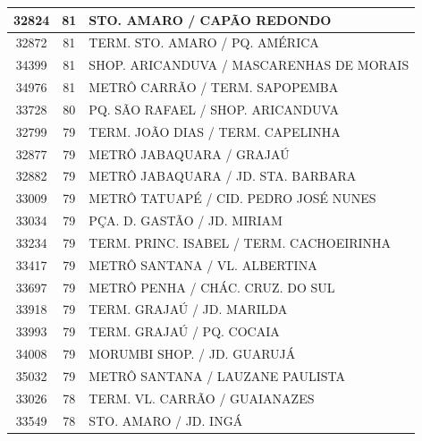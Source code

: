 \documentclass[
	12pt,				%
	oneside,			%
	a4paper,			%
	english,			%
	brazil				%
	]{abntex2ppgsi}
\begin{document}
{{\begin{apendicesenv}
\begin{longtable}{c|c|p{7cm}}
    32824 & 81    & STO. AMARO / CAPÃO REDONDO \\
\hline

    32872 & 81    & TERM. STO. AMARO / PQ. AMÉRICA \\
\hline

    34399 & 81    & SHOP. ARICANDUVA / MASCARENHAS DE MORAIS \\
\hline

    34976 & 81    & METRÔ CARRÃO / TERM. SAPOPEMBA \\
\hline

    33728 & 80    & PQ. SÃO RAFAEL / SHOP. ARICANDUVA \\
\hline

    32799 & 79    & TERM. JOÃO DIAS / TERM. CAPELINHA \\
\hline

    32877 & 79    & METRÔ JABAQUARA / GRAJAÚ \\
\hline

    32882 & 79    & METRÔ JABAQUARA / JD. STA. BARBARA \\
\hline

    33009 & 79    & METRÔ TATUAPÉ / CID. PEDRO JOSÉ NUNES \\
\hline

    33034 & 79    & PÇA. D. GASTÃO / JD. MIRIAM \\
\hline

    33234 & 79    & TERM. PRINC. ISABEL / TERM. CACHOEIRINHA \\
\hline

    33417 & 79    & METRÔ SANTANA / VL. ALBERTINA \\
\hline

    33697 & 79    & METRÔ PENHA / CHÁC. CRUZ. DO SUL \\
\hline

    33918 & 79    & TERM. GRAJAÚ / JD. MARILDA \\
\hline

    33993 & 79    & TERM. GRAJAÚ / PQ. COCAIA \\
\hline

    34008 & 79    & MORUMBI SHOP. / JD. GUARUJÁ \\
\hline

    35032 & 79    & METRÔ SANTANA / LAUZANE PAULISTA \\
\hline

    33026 & 78    & TERM. VL. CARRÃO / GUAIANAZES \\
\hline

    33549 & 78    & STO. AMARO / JD. INGÁ \\
\hline


\end{longtable}
\end{apendicesenv}}}
\end{document}
